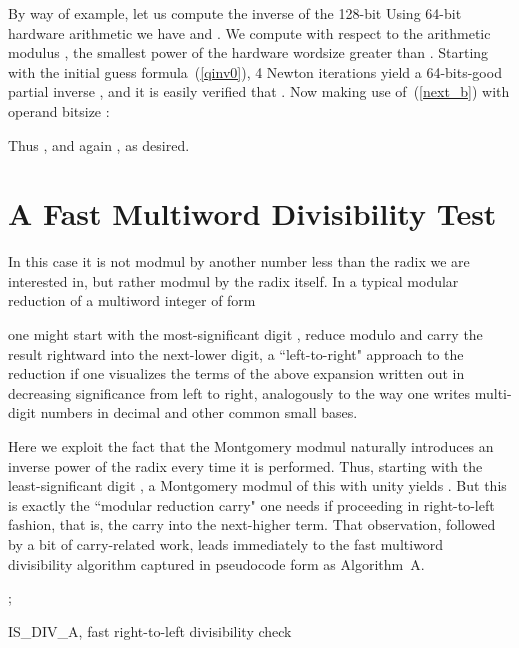 \documentclass{article}
\begin{document}
By way of example, let us compute the inverse of the 128-bit   Using 64-bit hardware arithmetic we have  and . We compute  with respect to the arithmetic modulus , the smallest power of the hardware wordsize greater than . Starting with the initial guess formula~(\ref{qinv0}), 4 Newton iterations yield a 64-bits-good partial inverse , and it is easily verified that . Now making use of~(\ref{next_b}) with operand bitsize :

Thus , and again , as desired.



\section{A Fast Multiword Divisibility Test}
\label{sect:algo_a}

In this case it is not modmul by another number less than the radix we are interested in, but rather modmul by the radix  itself. In a typical modular reduction of a multiword integer of form

one might start with the most-significant digit , reduce  modulo  and carry the result rightward into the next-lower digit, a ``left-to-right" approach to the reduction if one visualizes the terms of the above expansion written out in decreasing significance from left to right, analogously to the way one writes multi-digit numbers in decimal and other common small bases.

Here we exploit the fact that the Montgomery modmul naturally introduces an inverse power of the radix  every time it is performed. Thus, starting with the least-significant digit , a Montgomery modmul of this with unity yields . But this is exactly the ``modular reduction carry" one needs if proceeding in right-to-left fashion, that is, the carry into the next-higher term. That observation, followed by a bit of carry-related work, leads immediately to the fast multiword divisibility algorithm captured in pseudocode form as Algorithm~A.

\begin{algorithm}\SetAlgoLined
{}
\vspace{0.1in}
{
	;\\
	\Return \;
}
\caption{IS\_DIV\_A, fast right-to-left divisibility check}
\label{algo_a}
\end{algorithm}
\end{document}

